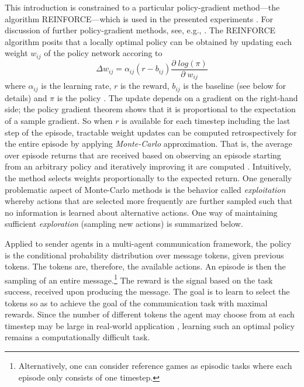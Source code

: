 This introduction is constrained to a particular policy-gradient method---the algorithm REINFORCE---which is used in the presented experiments \parencite{williams1992simple}. For discussion of further policy-gradient methods, see, e.g., \cite{sutton2018reinforcement}. 
The REINFORCE algorithm posits that a locally optimal policy can be obtained by updating each weight $w_{ij}$ of the policy network accoring to 
\begin{equation}
\label{eq:reinforce}
\Delta w_{ij} = \alpha_{ij} (r - b_{ij}) \frac{\partial \; log(\pi)}{\partial \; w_{ij}}
\end{equation}
where $\alpha_{ij}$ is the learning rate, $r$ is the reward, $b_{ij}$ is the baseline (see below for details) and $\pi$ is the policy \parencite[cf.][p.~234]{williams1992simple}. The update depends on a gradient on the right-hand side; the policy gradient theorem shows that it is proportional to the expectation of a sample gradient. So when $r$ is available for each timestep including the last step of the episode, tractable weight updates can be computed retrospectively for the entire episode by applying \textit{Monte-Carlo} approximation. That is, the average over episode returns that are received based on observing an episode starting from an arbitrary policy and iteratively improving it are computed \parencite{sutton2018reinforcement}. Intuitively, the method selects weights proportionally to the expected return. One generally problematic aspect of Monte-Carlo methods is the behavior called \textit{exploitation} whereby actions that are selected more frequently are further sampled such that no information is learned about alternative actions. One way of maintaining sufficient \textit{exploration} (sampling new actions) is summarized below. 

Applied to sender agents in a multi-agent communication framework, the policy is the conditional probability distribution over message tokens, given previous tokens. The tokens are, therefore, the available actions. An episode is then the sampling of an entire message.\footnote{Alternatively, one can consider reference games as episodic tasks where each episode only consists of one timestep.} The reward is the signal based on the task success, received upon producing the message. The goal is to learn to select the tokens so as to achieve the goal of the communication task with maximal rewards. Since the number of different tokens the agent may choose from at each timestep may be large in real-world application \parencite[cf.][]{he2015deep}, learning such an optimal policy remains a computationally difficult task.


